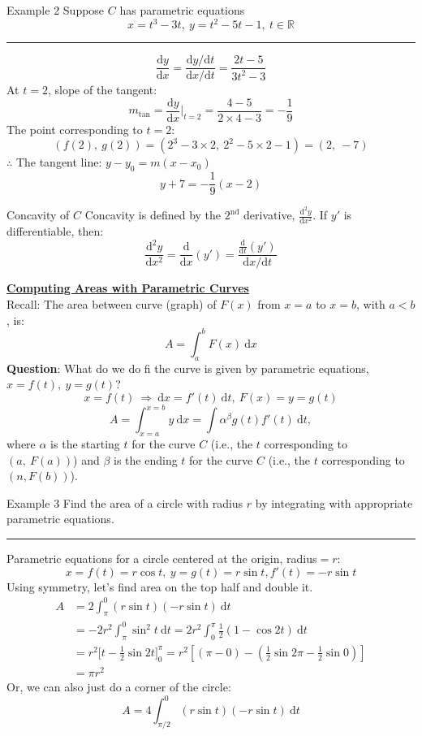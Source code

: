 \documentclass[12pt,a4paper]{article}
\def\R{{\mathbb{R}}}
\def\d{{\mathrm{d}}}
\def\ddx{\frac{\d}{\d x}}
\def\dydx{\frac{\d y}{\d x}}
\def\dx{\d x}
\begin{document}
\begin{eg}{Example 2}
	Suppose $C$ has parametric equations \[x=t^3-3t,\ y=t^2-5t-1,\ t\in\R \]	
	\noindent\rule[0.25\baselineskip]{\textwidth}{1pt}
	\[\dydx=\frac{\d y/\d t}{\dx/\d t}=\frac{2t-5}{3t^2-3}\]
	At $t=2$, slope of the tangent: \[m_\text{tan}=\dydx\bigg|_{t=2}=\frac{4-5}{2\times4-3}=-\frac{1}{9}\]
	The point corresponding to $t=2$: \[(f(2),\ g(2))=(2^3-3\times2,\ 2^2-5\times2-1)=(2,\ -7)\]
	$\therefore$ The tangent line: $y-y_0=m(x-x_0)$ \[y+7=-\frac{1}{9}(x-2)\]
\end{eg}
\begin{thm}{Concavity of $C$}
	Concavity is defined by the $2^\text{nd}$ derivative, $\displaystyle\frac{\d^2 y}{\dx^2}$. If $y'$ is differentiable, then: \[\boxed{\frac{\d^2 y}{\dx^2}=\ddx(y')=\frac{\frac{\d}{\d t}(y')}{\dx/\d t}}\]
\end{thm}
\textbf{\underline{Computing Areas with Parametric Curves}}\\
Recall: The area between curve (graph) of $F(x)$ from $x=a$ to $x=b$, with $a<b$, is: \[A=\int_a^bF(x)\ \dx\]
\textbf{Question}: What do we do fi the curve is given by parametric equations, $x=f(t),\ y=g(t)$? 
\[x=f(t)\ \Rightarrow\ \dx=f'(t)\ \d t,\ F(x)=y=g(t)\]
\[A=\int_{x=a}^{x=b}y\ \dx=\int\alpha^\beta g(t)f'(t)\ \d t, \] where $\alpha$ is the starting $t$ for the curve $C$ (i.e., the $t$ corresponding to $(a,\ F(a))$) and $\beta$ is the ending $t$ for the curve $C$ (i.e., the $t$ corresponding to $(n, F(b))$).
\begin{eg}{Example 3}
	Find the area of a circle with radius $r$ by integrating with appropriate parametric equations. \\	
	\noindent\rule[0.25\baselineskip]{\textwidth}{1pt}
	Parametric equations for a circle centered at the origin, radius$=r$: \[x=f(t)=r\cos{t},\ y=g(t)=r\sin{t}, f'(t)=-r\sin{t}\]
	Using symmetry, let's find area on the top half and double it. 
	\[\begin{aligned}
		A&=2\int_\pi^0(r\sin{t})(-r\sin{t})\ \d t\\
		&=-2r^2\int_\pi^0\sin^2t\ \d t=2r^2\int_0^\pi\frac{1}{2}(1-\cos{2t})\ \d t\\
		&=r^2\bigg[t-\frac{1}{2}\sin{2t}\bigg]_0^\pi=r^2\left[(\pi-0)-\left(\frac{1}{2}\sin{2\pi}-\frac{1}{2}\sin{0}\right)\right]\\
		&=\pi r^2
	\end{aligned}\]
	Or, we can also just do a corner of the circle: \[A=4\int_{\pi/2}^0(r\sin{t})(-r\sin{t})\ \d t\]
\end{eg}
\end{document}
